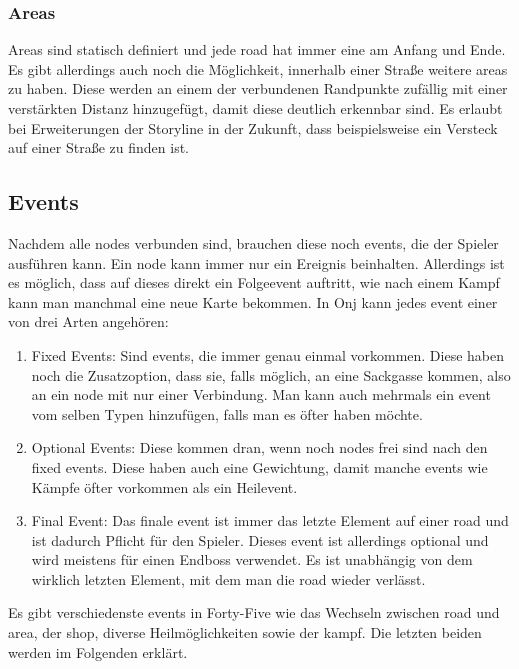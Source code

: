 \subsubsection{Areas}\label{subsubsec:areas}
Areas sind statisch definiert und jede road hat immer eine am Anfang und Ende.
Es gibt allerdings auch noch die Möglichkeit, innerhalb einer Straße weitere areas zu haben.
Diese werden an einem der verbundenen Randpunkte zufällig mit einer verstärkten Distanz hinzugefügt, damit diese deutlich erkennbar sind.
Es erlaubt bei Erweiterungen der Storyline in der Zukunft, dass beispielsweise ein Versteck auf einer Straße zu finden ist.

\subsection{Events}\label{subsec:events}
Nachdem alle nodes verbunden sind, brauchen diese noch events, die der Spieler ausführen kann.
Ein node kann immer nur ein Ereignis beinhalten.
Allerdings ist es möglich, dass auf dieses direkt ein Folgeevent auftritt, wie \zB nach einem Kampf kann man manchmal eine neue Karte bekommen.
In Onj kann jedes event einer von drei Arten angehören:

\begin{enumerate}
    \item Fixed Events: Sind events, die immer genau einmal vorkommen.
    Diese haben noch die Zusatzoption, dass sie, falls möglich, an eine Sackgasse kommen, also an ein node mit nur einer Verbindung.
    Man kann auch mehrmals ein event vom selben Typen hinzufügen, falls man es öfter haben möchte.
    \item Optional Events: Diese kommen dran, wenn noch nodes frei sind nach den fixed events.
    Diese haben auch eine Gewichtung, damit manche events wie Kämpfe öfter vorkommen als \zB ein Heilevent.
    \item Final Event: Das finale event ist immer das letzte Element auf einer road und ist dadurch Pflicht für den Spieler.
    Dieses event ist allerdings optional und wird meistens für einen Endboss verwendet.
    Es ist unabhängig von dem wirklich letzten Element, mit dem man die road wieder verlässt.
\end{enumerate}

Es gibt verschiedenste events in Forty-Five wie das Wechseln zwischen road und area, der shop, diverse Heilmöglichkeiten sowie der kampf.
Die letzten beiden werden im Folgenden erklärt.

